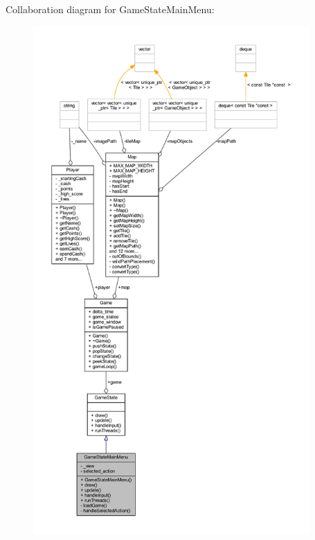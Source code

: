 Collaboration diagram for Game\+State\+Main\+Menu\+:
\nopagebreak
\begin{figure}[H]
\begin{center}
\leavevmode
\includegraphics[height=550pt]{class_game_state_main_menu__coll__graph}
\end{center}
\end{figure}
